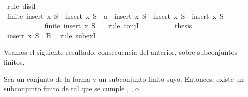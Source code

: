 \begin{isabellebody}
\ {\isacharparenleft}rule\ disjI{}{\isacharparenright}\isanewline
\ \ \ \ \ \ \ \ \isamarkupfalse%
\ {\isachardoublequoteopen}finite\ {\isacharparenleft}insert\ x\ S{\isacharprime}{\isacharparenright}\ {\isasymand}\ {\isacharparenleft}insert\ x\ S\ {\isacharequal}\ {\isacharbraceleft}a{\isacharbraceright}\ {\isasymunion}\ {\isacharparenleft}insert\ x\ S{\isacharprime}{\isacharparenright}\ {\isasymor}\ insert\ x\ S\ {\isacharequal}\ insert\ x\ S{\isacharprime}{\isacharparenright}{\isachardoublequoteclose}\isanewline
\ \ \ \ \ \ \ \ \ \ \isamarkupfalse%
\ {\isacartoucheopen}finite\ {\isacharparenleft}insert\ x\ S{\isacharprime}{\isacharparenright}{\isacartoucheclose}\ {}\ \isamarkupfalse%
\ {\isacharparenleft}rule\ conjI{\isacharparenright}\isanewline
\ \ \ \ \ \ \ \ \isamarkupfalse%
\ {\isacharquery}thesis\isanewline
\ \ \ \ \ \ \ \ \ \ \isamarkupfalse%
\ {\isacartoucheopen}insert\ x\ S{\isacharprime}\ {\isasymsubseteq}\ B{\isacartoucheclose}\ \isamarkupfalse%
\ {\isacharparenleft}rule\ subexI{\isacharparenright}\isanewline
\ \ \ \ \ \ \isamarkupfalse%
\isanewline
\ \ \ \ \isamarkupfalse%
\isanewline
\ \ \isamarkupfalse%
\isanewline
{}\isamarkupfalse%
%
\endisatagproof
{\isafoldproof}%
%
\isadelimproof
%
\endisadelimproof
%
\begin{isamarkuptext}%
Veamos el siguiente resultado, consecuencia del anterior, sobre subconjuntos finitos.

\begin{lema}
  Sea un conjunto de la forma  y  un subconjunto finito suyo. Entonces, existe un
  subconjunto finito  de  tal que se cumple , ,  
  o .
\end{lema}


\end{isamarkuptext}
\end{isabellebody}
